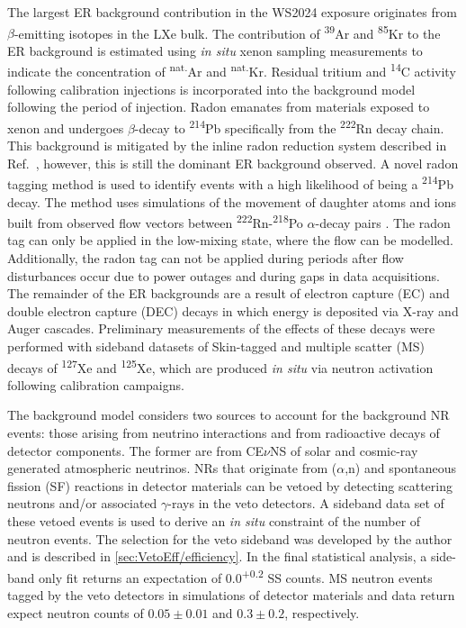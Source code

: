 The largest ER background contribution in the WS2024 exposure originates from $\beta$-emitting isotopes in the LXe bulk. The contribution of \textsuperscript{39}Ar and \textsuperscript{85}Kr to the ER background is estimated using \textit{in situ} xenon sampling measurements to indicate the concentration of \textsuperscript{nat.}Ar and \textsuperscript{nat.}Kr. Residual tritium and \textsuperscript{14}C activity following calibration injections is incorporated into the background model following the period of injection. Radon emanates from materials exposed to xenon and undergoes $\beta$-decay to \textsuperscript{214}Pb specifically from the \textsuperscript{222}Rn decay chain. This background is mitigated by the inline radon reduction system described in Ref.~\cite{marthurs:thesis}, however, this is still the dominant ER background observed. A novel radon tagging method is used to identify events with a high likelihood of being a \textsuperscript{214}Pb decay. The method uses simulations of the movement of daughter atoms and ions built from observed flow vectors between \textsuperscript{222}Rn-\textsuperscript{218}Po $\alpha$-decay pairs \cite{McLaughlin:thesis}. The radon tag can only be applied in the low-mixing state, where the flow can be modelled. Additionally, the radon tag can not be applied during periods after flow disturbances occur due to power outages and during gaps in data acquisitions. The remainder of the ER backgrounds are a result of electron capture (EC) and double electron capture (DEC) decays in which energy is deposited via X-ray and Auger cascades. Preliminary measurements of the effects of these decays were performed with sideband datasets of Skin-tagged and multiple scatter (MS) decays of \textsuperscript{127}Xe and \textsuperscript{125}Xe, which are produced \textit{in situ} via neutron activation following calibration campaigns.

The background model considers two sources to account for the background NR events: those arising from neutrino interactions and from radioactive decays of detector components. The former are from CE$\nu$NS of solar and cosmic-ray generated atmospheric neutrinos. NRs that originate from ($\alpha$,n) and spontaneous fission (SF) reactions in detector materials can be vetoed by detecting scattering neutrons and/or associated $\gamma$-rays in the veto detectors. A sideband data set of these vetoed events is used to derive an \textit{in situ} constraint of the number of neutron events. The selection for the veto sideband was developed by the author and is described in \autoref{sec:VetoEff/efficiency}.
In the final statistical analysis, a side-band only fit returns an expectation of 0.0\textsuperscript{+0.2} SS counts. MS neutron events tagged by the veto detectors in simulations of detector materials and data return expect neutron counts of $0.05\pm0.01$ and $0.3\pm0.2$, respectively.

